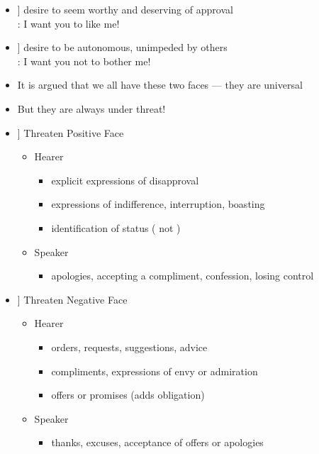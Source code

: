 \documentclass[a4paper,landscape,headrule,footrule,xetex]{foils}
\newcommand{\PF}[1]{\Smiley[#1][green]}
\newcommand{\NF}[1]{\Annoey[#1][red]}
\begin{document}
\begin{itemize}
\item[\PF{2}]  desire to seem worthy and deserving of approval
  \\ : I want you to like me!
\bigskip\bigskip\bigskip
\item[\NF{2}]  desire to be autonomous, unimpeded by others
  \\ : I want you not to bother me!
\bigskip\bigskip\bigskip
\item It is argued that we all have these two faces --- they are universal
\item But they are always under threat!

\end{itemize}


\begin{itemize}
\item[\PF{1}] Threaten Positive Face
  \begin{itemize}
  \item Hearer
    \begin{itemize}
    \item explicit expressions of disapproval 
    \item expressions of indifference, interruption, boasting
    \item identification of status ( not )
    \end{itemize}
  \item Speaker
    \begin{itemize}
    \item apologies, accepting a compliment, confession, losing control
    \end{itemize}
  \end{itemize}
\item[\NF{1}] Threaten Negative Face
  \begin{itemize}
  \item Hearer
    \begin{itemize}
    \item orders, requests, suggestions, advice
    \item compliments, expressions of envy or admiration
    \item offers or promises (adds obligation)
    \end{itemize}
  \item Speaker
    \begin{itemize}
    \item thanks, excuses, acceptance of offers or apologies
    \end{itemize}
  \end{itemize}
\end{itemize}
\end{document}
